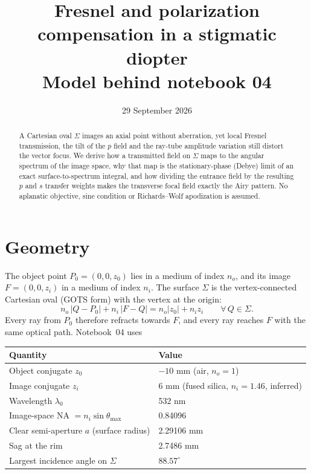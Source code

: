\documentclass[11pt,a4paper]{article}
\title{Fresnel and polarization compensation in a stigmatic diopter\\[2pt]
\large Model behind notebook 04}
\date{29 September 2026}
\begin{document}
\maketitle

\begin{abstract}
A Cartesian oval $\Sigma$ images an axial point without aberration, yet local
Fresnel transmission, the tilt of the $p$ field and the ray-tube amplitude
variation still distort the vector focus. We derive how a transmitted field on
$\Sigma$ maps to the angular spectrum of the image space, why that map is the
stationary-phase (Debye) limit of an exact surface-to-spectrum integral, and how
dividing the entrance field by the resulting $p$ and $s$ transfer weights makes
the transverse focal field exactly the Airy pattern. No aplanatic objective,
sine condition or Richards--Wolf apodization is assumed.
\end{abstract}

\section{Geometry}

The object point $P_0=(0,0,z_0)$ lies in a medium of index $n_o$, and its image
$F=(0,0,z_i)$ in a medium of index $n_i$. The surface $\Sigma$ is the
vertex-connected Cartesian oval (GOTS form) with the vertex at the origin:
\begin{equation}
 n_o\,|Q-P_0| + n_i\,|F-Q| = n_o|z_0| + n_i z_i \qquad \forall\,Q\in\Sigma .
 \label{eq:oval}
\end{equation}
Every ray from $P_0$ therefore refracts towards $F$, and every ray reaches $F$ with
the same optical path. Notebook~04 uses

\begin{center}
\begin{tabular}{ll}
\toprule
Quantity & Value \\
\midrule
Object conjugate $z_0$ & $-10$ mm (air, $n_o=1$) \\
Image conjugate $z_i$ & $6$ mm (fused silica, $n_i=1.46$, inferred) \\
Wavelength $\lambda_0$ & 532 nm \\
Image-space NA $=n_i\sin\theta_{\max}$ & 0.84096 \\
Clear semi-aperture $a$ (surface radius) & 2.29106 mm \\
Sag at the rim & 2.7486 mm \\
Largest incidence angle on $\Sigma$ & $88.57^\circ$ \\
\bottomrule
\end{tabular}
\end{center}
\end{document}
